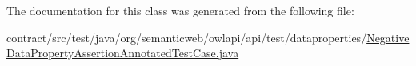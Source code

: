 The documentation for this class was generated from the following file\-:\begin{DoxyCompactItemize}
\item 
contract/src/test/java/org/semanticweb/owlapi/api/test/dataproperties/\hyperlink{_negative_data_property_assertion_annotated_test_case_8java}{Negative\-Data\-Property\-Assertion\-Annotated\-Test\-Case.\-java}\end{DoxyCompactItemize}
